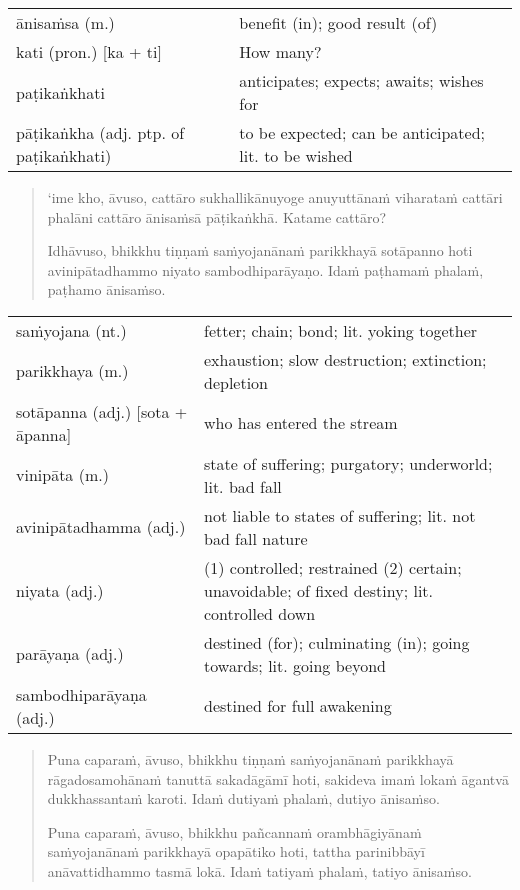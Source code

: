\documentclass[11pt,oneside]{memoir}
\begin{document}
\begin{longtable}{L{\colOne} L{\colTwo}}
ānisaṁsa (m.) & benefit (in); good result (of)\\[0pt]
kati (pron.) [ka + ti] & How many?\\[0pt]
paṭikaṅkhati & anticipates; expects; awaits; wishes for\\[0pt]
pāṭikaṅkha (adj. ptp. of paṭikaṅkhati) & to be expected; can be anticipated; lit. to be wished\\[0pt]
\end{longtable}

\begin{quote}
‘ime kho, āvuso, cattāro sukhallikānuyoge anuyuttānaṁ viharataṁ cattāri phalāni
cattāro ānisaṁsā pāṭikaṅkhā. Katame cattāro?

Idhāvuso, bhikkhu tiṇṇaṁ saṁyojanānaṁ parikkhayā sotāpanno hoti avinipātadhammo
niyato sambodhiparāyaṇo. Idaṁ paṭhamaṁ phalaṁ, paṭhamo ānisaṁso.
\end{quote}

\begin{longtable}{L{\colOne} L{\colTwo}}
saṁyojana (nt.) & fetter; chain; bond; lit. yoking together\\[0pt]
parikkhaya (m.) & exhaustion; slow destruction; extinction; depletion\\[0pt]
sotāpanna (adj.) [sota + āpanna] & who has entered the stream\\[0pt]
vinipāta (m.) & state of suffering; purgatory; underworld; lit. bad fall\\[0pt]
avinipātadhamma (adj.) & not liable to states of suffering; lit. not bad fall nature\\[0pt]
niyata (adj.) & (1) controlled; restrained (2) certain; unavoidable; of fixed destiny; lit. controlled down\\[0pt]
parāyaṇa (adj.) & destined (for); culminating (in); going towards; lit. going beyond\\[0pt]
sambodhiparāyaṇa (adj.) & destined for full awakening\\[0pt]
\end{longtable}

\begin{quote}
Puna caparaṁ, āvuso, bhikkhu tiṇṇaṁ saṁyojanānaṁ parikkhayā rāgadosamohānaṁ
tanuttā sakadāgāmī hoti, sakideva imaṁ lokaṁ āgantvā dukkhassantaṁ karoti. Idaṁ
dutiyaṁ phalaṁ, dutiyo ānisaṁso.

Puna caparaṁ, āvuso, bhikkhu pañcannaṁ orambhāgiyānaṁ saṁyojanānaṁ parikkhayā
opapātiko hoti, tattha parinibbāyī anāvattidhammo tasmā lokā. Idaṁ tatiyaṁ
phalaṁ, tatiyo ānisaṁso.
\end{quote}
\end{document}
